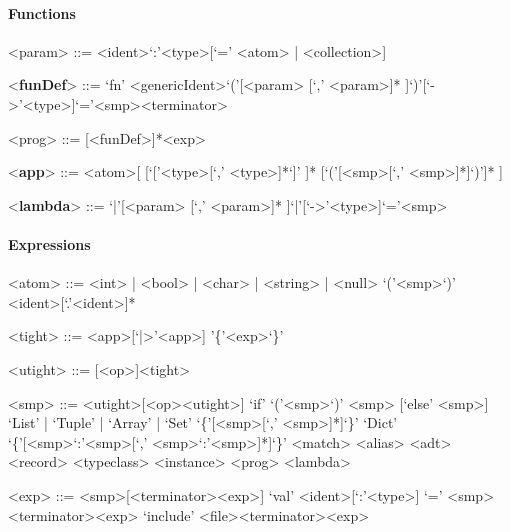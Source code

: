 \documentclass[11pt]{article} %
\begin{document}
\paragraph{Functions}

\begin{grammar}

<param> ::= <ident>`:'<type>[`=' <atom> | <collection>]

<\textbf{funDef}> ::= `fn' <genericIdent>`('[<param> [`,' <param>]* ]`)'[`->'<type>]`='<smp><terminator>

<prog> ::= [<funDef>]*<exp>

<\textbf{app}> ::= <atom>[ [`['<type>[`,' <type>]*`]' ]* [`('[<smp>[`,' <smp>]*]`)']* ]

<\textbf{lambda}> ::= `|'[<param> [`,' <param>]* ]`|'[`->'<type>]`='<smp>

\end{grammar}

\paragraph{Expressions}

\begin{grammar}

<atom> ::= <int> | <bool> | <char> | <string> | <null>
\alt `('<smp>`)'
\alt <ident>[`.'<ident>]*

<tight> ::= <app>[`|>'<app>]
\alt '\{'<exp>`\}'

<utight> ::= [<op>]<tight>

<smp> ::= <utight>[<op><utight>]
\alt `if' `('<smp>`)' <smp> [`else' <smp>]
\alt `List' | `Tuple' | `Array' | `Set' `\{'[<smp>[`,' <smp>]*]`\}'
\alt `Dict' `\{'[<smp>`:'<smp>[`,' <smp>`:'<smp>]*]`\}'
\alt <match>
\alt <alias>
\alt <adt>
\alt <record>
\alt <typeclass>
\alt <instance>
\alt <prog>
\alt <lambda>

<exp> ::= <smp>[<terminator><exp>]
\alt [`lazy'] `val' <ident>[`:'<type>] `=' <smp><terminator><exp>
\alt `include' <file><terminator><exp>

\end{grammar}
\end{document}
